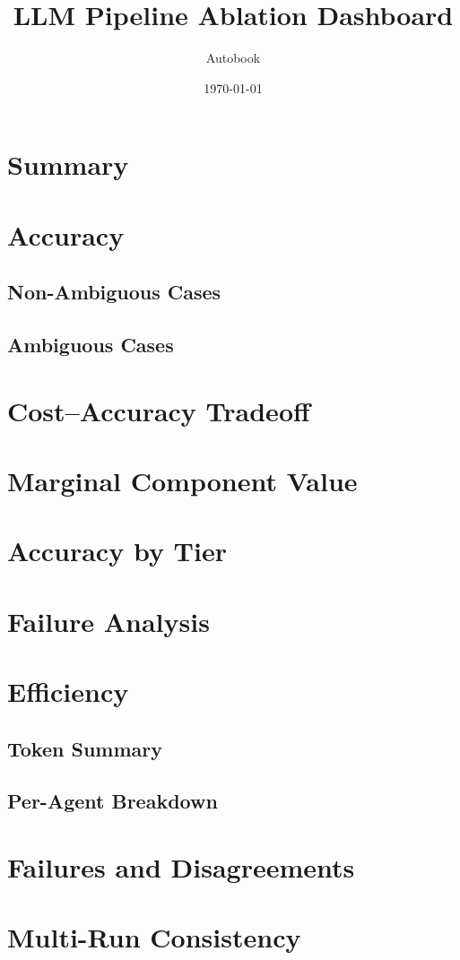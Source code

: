 \documentclass[11pt, a4paper]{article}
\title{LLM Pipeline Ablation Dashboard}
\author{Autobook}
\date{\today}
\begin{document}
\maketitle

\section{Summary}


\section{Accuracy}
\subsection{Non-Ambiguous Cases}

\subsection{Ambiguous Cases}


\section{Cost--Accuracy Tradeoff}


\section{Marginal Component Value}


\section{Accuracy by Tier}


\section{Failure Analysis}


\section{Efficiency}
\subsection{Token Summary}

\subsection{Per-Agent Breakdown}


\section{Failures and Disagreements}


\section{Multi-Run Consistency}

\end{document}
